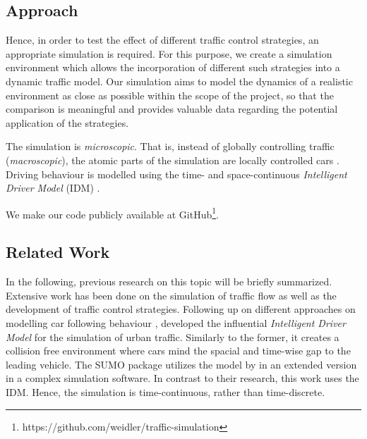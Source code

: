 \documentclass[11pt]{article}
\begin{document}
\subsection{Approach}
Hence, in order to test the effect of different traffic control strategies, an appropriate simulation is required. For this purpose, we create a simulation environment which allows the incorporation of different such strategies into a dynamic traffic model. Our simulation aims to model the dynamics of a realistic environment as close as possible within the scope of the project, so that the comparison is meaningful and provides valuable data regarding the potential application of the strategies. 

The simulation is \textit{microscopic}. That is, instead of globally controlling traffic (\textit{macroscopic}), the atomic parts of the simulation are locally controlled cars \citep[see also][]{krajzewicz2002sumo}. Driving behaviour is modelled using the time- and space-continuous \textit{Intelligent Driver Model} (IDM) \citep{treiber2000congested}. 

We make our code publicly available at GitHub\footnote{https://github.com/weidler/traffic-simulation}.

\subsection{Related Work}
\label{sec:related-work}
In the following, previous research on this topic will be briefly summarized. Extensive work has been done on the simulation of traffic flow as well as the development of traffic control strategies. Following up on different approaches on modelling car following behaviour \citep[e.g.][]{gipps1981behavioural}, \citet{treiber2000congested} developed the influential \textit{Intelligent Driver Model} for the simulation of urban traffic. Similarly to the former, it creates a collision free environment where cars mind the  spacial and time-wise gap to the leading vehicle. The SUMO package \citep{krajzewicz2002sumo, behrisch2011sumo} utilizes the model by \citep{gipps1981behavioural} in an extended version \citep{krauss1998microscopic} in a complex simulation software. In contrast to their research, this work uses the IDM. Hence, the simulation is time-continuous, rather than time-discrete.
\end{document}
